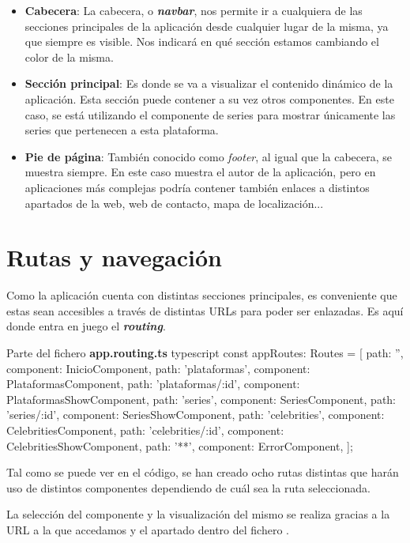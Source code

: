 \documentclass{\ClassPath/viu-tfm-template}
\begin{document}
\begin{itemize}
    \item \textbf{Cabecera}: La cabecera, o \textit{\textbf{navbar}}, nos permite ir a cualquiera de las secciones principales de la aplicación desde cualquier lugar de la misma, ya que siempre es visible. Nos indicará en qué sección estamos cambiando el color de la misma.

    \item \textbf{Sección principal}: Es donde se va a visualizar el contenido dinámico de la aplicación. Esta sección puede contener a su vez otros componentes. En este caso, se está utilizando el componente de series para mostrar únicamente las series que pertenecen a esta plataforma.

    \item \textbf{Pie de página}: También conocido como \textit{footer}, al igual que la cabecera, se muestra siempre. En este caso muestra el autor de la aplicación, pero en aplicaciones más complejas podría contener también enlaces a distintos apartados de la web, web de contacto, mapa de localización...
\end{itemize}

\section{Rutas y navegación}
Como la aplicación cuenta con distintas secciones principales, es conveniente que estas sean accesibles a través de distintas URLs para poder ser enlazadas. Es aquí donde entra en juego el \textbf{\textit{routing}}.

\begin{mycode}{Parte del fichero \textbf{app.routing.ts} }{typescript}{}
const appRoutes: Routes = [
  {path: '', component: InicioComponent},
  {path: 'plataformas', component: PlataformasComponent},
  {path: 'plataformas/:id', component: PlataformasShowComponent},
  {path: 'series', component: SeriesComponent},
  {path: 'series/:id', component: SeriesShowComponent},
  {path: 'celebrities', component: CelebritiesComponent},
  {path: 'celebrities/:id', component: CelebritiesShowComponent},
  {path: '**', component: ErrorComponent},
];
\end{mycode}

Tal como se puede ver en el código, se han creado ocho rutas distintas que harán uso de distintos componentes dependiendo de cuál sea la ruta seleccionada.

La selección del componente y la visualización del mismo se realiza gracias a la URL a la que accedamos y el apartado  dentro del fichero .
\end{document}
